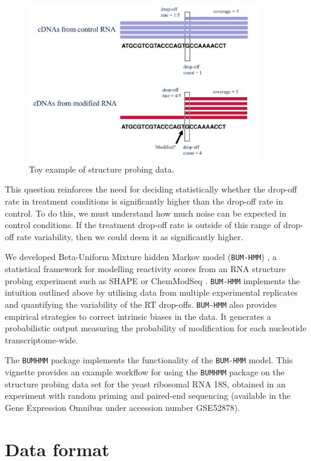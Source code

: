 \documentclass{article}\usepackage[]{graphicx}\usepackage[usenames,dvipsnames]{color}
\begin{document}
\begin{figure}[h]
\caption{Toy example of structure probing data.}
\centering
\includegraphics[width=0.9\textwidth]{toyEx_structureProbing.png}
\end{figure}

This question reinforces the need for deciding statistically whether the
drop-off rate in treatment conditions is significantly higher than the drop-off
rate in control. To do this, we must understand how much noise can be expected
in control conditions. If the treatment drop-off rate is outside of this range
of drop-off rate variability, then we could deem it as significantly higher.

We developed Beta-Uniform Mixture hidden Markov model (\verb|BUM-HMM|)
\cite{selega2016robust}, a statistical framework for modelling reactivity scores
from an RNA structure probing experiment such as SHAPE
\cite{spitale2013rna} or ChemModSeq \cite{hector2014snapshots}. \verb|BUM-HMM|
implements the intuition outlined above by utilising data from multiple
experimental replicates and quantifying the variability of the RT drop-offs.
\verb|BUM-HMM| also provides empirical strategies to correct intrinsic biases in
the data. It generates a probabilistic output measuring the probability of
modification for each nucleotide transcriptome-wide.

The \verb|BUMHMM| package implements the functionality of the \verb|BUM-HMM|
model. This vignette provides an example workflow for using the \verb|BUMHMM|
package on the structure probing data set for the yeast ribosomal RNA 18S,
obtained in an experiment with random priming and paired-end sequencing
(available in the Gene Expression Omnibus under accession number GSE52878).

\section{Data format}
\end{document}

